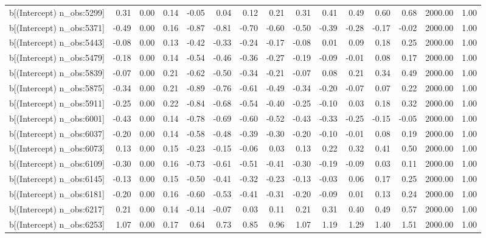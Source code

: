 \begin{table}[ht]
\begin{tabular}{rrrrrrrrrrrrrrr}
  b[(Intercept) n\_obs:5299] & 0.31 & 0.00 & 0.14 & -0.05 & 0.04 & 0.12 & 0.21 & 0.31 & 0.41 & 0.49 & 0.60 & 0.68 & 2000.00 & 1.00 \\ 
  b[(Intercept) n\_obs:5371] & -0.49 & 0.00 & 0.16 & -0.87 & -0.81 & -0.70 & -0.60 & -0.50 & -0.39 & -0.28 & -0.17 & -0.02 & 2000.00 & 1.00 \\ 
  b[(Intercept) n\_obs:5443] & -0.08 & 0.00 & 0.13 & -0.42 & -0.33 & -0.24 & -0.17 & -0.08 & 0.01 & 0.09 & 0.18 & 0.25 & 2000.00 & 1.00 \\ 
  b[(Intercept) n\_obs:5479] & -0.18 & 0.00 & 0.14 & -0.54 & -0.46 & -0.36 & -0.27 & -0.19 & -0.09 & -0.01 & 0.08 & 0.17 & 2000.00 & 1.00 \\ 
  b[(Intercept) n\_obs:5839] & -0.07 & 0.00 & 0.21 & -0.62 & -0.50 & -0.34 & -0.21 & -0.07 & 0.08 & 0.21 & 0.34 & 0.49 & 2000.00 & 1.00 \\ 
  b[(Intercept) n\_obs:5875] & -0.34 & 0.00 & 0.21 & -0.89 & -0.76 & -0.61 & -0.49 & -0.34 & -0.20 & -0.07 & 0.07 & 0.22 & 2000.00 & 1.00 \\ 
  b[(Intercept) n\_obs:5911] & -0.25 & 0.00 & 0.22 & -0.84 & -0.68 & -0.54 & -0.40 & -0.25 & -0.10 & 0.03 & 0.18 & 0.32 & 2000.00 & 1.00 \\ 
  b[(Intercept) n\_obs:6001] & -0.43 & 0.00 & 0.14 & -0.78 & -0.69 & -0.60 & -0.52 & -0.43 & -0.33 & -0.25 & -0.15 & -0.05 & 2000.00 & 1.00 \\ 
  b[(Intercept) n\_obs:6037] & -0.20 & 0.00 & 0.14 & -0.58 & -0.48 & -0.39 & -0.30 & -0.20 & -0.10 & -0.01 & 0.08 & 0.19 & 2000.00 & 1.00 \\ 
  b[(Intercept) n\_obs:6073] & 0.13 & 0.00 & 0.15 & -0.23 & -0.15 & -0.06 & 0.03 & 0.13 & 0.22 & 0.32 & 0.41 & 0.50 & 2000.00 & 1.00 \\ 
  b[(Intercept) n\_obs:6109] & -0.30 & 0.00 & 0.16 & -0.73 & -0.61 & -0.51 & -0.41 & -0.30 & -0.19 & -0.09 & 0.03 & 0.11 & 2000.00 & 1.00 \\ 
  b[(Intercept) n\_obs:6145] & -0.13 & 0.00 & 0.15 & -0.50 & -0.41 & -0.32 & -0.23 & -0.13 & -0.03 & 0.06 & 0.17 & 0.25 & 2000.00 & 1.00 \\ 
  b[(Intercept) n\_obs:6181] & -0.20 & 0.00 & 0.16 & -0.60 & -0.53 & -0.41 & -0.31 & -0.20 & -0.09 & 0.01 & 0.13 & 0.24 & 2000.00 & 1.00 \\ 
  b[(Intercept) n\_obs:6217] & 0.21 & 0.00 & 0.14 & -0.14 & -0.07 & 0.03 & 0.11 & 0.21 & 0.31 & 0.40 & 0.49 & 0.57 & 2000.00 & 1.00 \\ 
  b[(Intercept) n\_obs:6253] & 1.07 & 0.00 & 0.17 & 0.64 & 0.73 & 0.85 & 0.96 & 1.07 & 1.19 & 1.29 & 1.40 & 1.51 & 2000.00 & 1.00 \\ 

\end{tabular}
\end{table}
